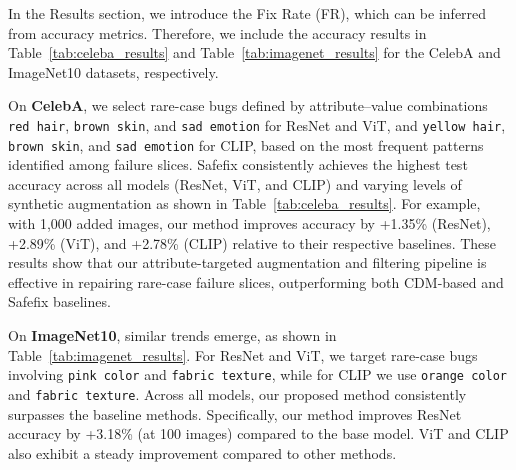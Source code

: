 \documentclass[10pt]{article} %
\newcommand{\model}{Safefix\xspace}
\newcommand{\hibug}{Safefix\xspace}
\begin{document}
In the Results section, we introduce the Fix Rate (FR), which can be inferred from accuracy metrics. Therefore, we include the accuracy results in Table~\ref{tab:celeba_results} and Table~\ref{tab:imagenet_results} for the CelebA and ImageNet10 datasets, respectively.

On \textbf{CelebA}, we select rare-case bugs defined by attribute–value combinations \texttt{red hair}, \texttt{brown skin}, and \texttt{sad emotion} for ResNet and ViT, and \texttt{yellow hair}, \texttt{brown skin}, and \texttt{sad emotion} for CLIP, based on the most frequent patterns identified among failure slices. \model{} consistently achieves the highest test accuracy across all models (ResNet, ViT, and CLIP) and varying levels of synthetic augmentation as shown in Table~\ref{tab:celeba_results}. For example, with 1{,}000 added images, our method improves accuracy by +1.35\% (ResNet), +2.89\% (ViT), and +2.78\% (CLIP) relative to their respective baselines. These results show that our attribute-targeted augmentation and filtering pipeline is effective in repairing rare-case failure slices, outperforming both CDM-based and \hibug{} baselines.


On \textbf{ImageNet10}, similar trends emerge, as shown in Table~\ref{tab:imagenet_results}. For ResNet and ViT, we target rare-case bugs involving \texttt{pink color} and \texttt{fabric texture}, while for CLIP we use \texttt{orange color} and \texttt{fabric texture}. Across all models, our proposed method consistently surpasses the baseline methods. Specifically, our method improves ResNet accuracy by +3.18\% (at 100 images) compared to the base model. ViT and CLIP also exhibit a steady improvement compared to other methods.
\end{document}
